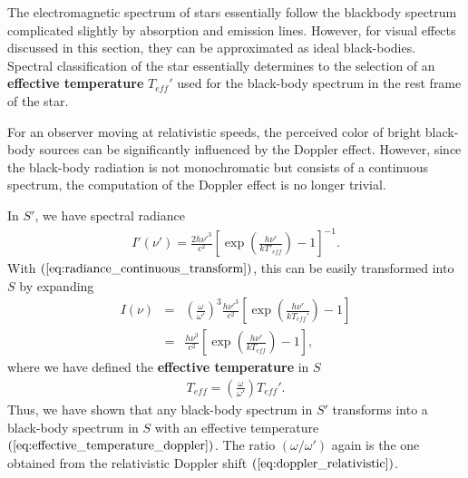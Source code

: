 \documentclass [12pt, a4paper] {article}
\begin{document}
The electromagnetic spectrum of stars essentially follow the 
blackbody spectrum complicated slightly by absorption and emission lines. 
However, for visual effects discussed in this section, they can be approximated as ideal black-bodies.
Spectral classification of the star essentially determines to the selection of an
\textbf{effective temperature} $T_{eff}'$ used for the black-body spectrum in the 
rest frame of the star. 

For an observer moving at relativistic speeds, the perceived color of bright 
black-body sources can be significantly influenced by the Doppler effect. However, 
since the black-body radiation is not monochromatic but consists of a continuous 
spectrum, the computation of the Doppler effect is no longer trivial. 

In $S'$, we have spectral radiance
\begin {eqnarray}
    I'(\nu') 
    = 
    \frac{2h{\nu'}^3}{c^2}
    \left[
        \exp\left(\frac{h\nu'}{kT'_{eff}}\right) - 1
    \right]^{-1}.
\end {eqnarray}
With $(\ref{eq:radiance_continuous_transform})$, this can be easily transformed 
into $S$ by expanding
\begin {eqnarray}
    I(\nu) 
    &=& 
    \left(\frac{\omega}{\omega'}\right)^3
    \frac{h\nu'^3}{c^2}
    \left[
        \exp\left(
            \frac{h\nu'}{kT_{eff}'}
        \right)
        - 1
    \right]
    \\
    &=& 
    \frac{h\nu^3}{c^2}
    \left[
        \exp\left(
            \frac{h\nu'}{kT_{eff}}
        \right)
        - 1
    \right],
\end {eqnarray}
where we have defined the \textbf{effective temperature} in $S$
\begin {eqnarray}
    \label{eq:effective_temperature_doppler}
    \boxed{
        \quad
        T_{eff} 
        =
        \left(\frac{\omega}{\omega'}\right)
        T_{eff}'.
        \quad
    }
\end {eqnarray}
Thus, we have shown that any black-body spectrum in $S'$ transforms into a 
black-body spectrum in $S$ with an effective temperature 
$(\ref{eq:effective_temperature_doppler})$. The ratio $(\omega/\omega')$ again 
is the one obtained from the relativistic Doppler shift 
$(\ref{eq:doppler_relativistic})$.
\end{document}
